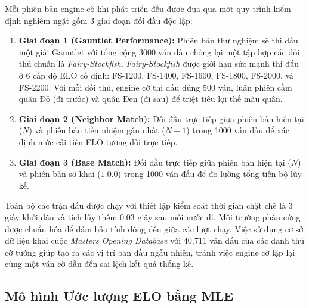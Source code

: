 Mỗi phiên bản engine cờ khi phát triển đều được đưa qua một quy trình kiểm định nghiêm ngặt gồm 3 giai đoạn đối đầu độc lập:

\begin{enumerate}
    \item \textbf{Giai đoạn 1 (Gauntlet Performance):} Phiên bản thử nghiệm sẽ thi đấu một giải Gauntlet với tổng cộng 3000 ván đấu chống lại một tập hợp các đối thủ chuẩn là \textit{Fairy-Stockfish}. \textit{Fairy-Stockfish} được giới hạn sức mạnh thi đấu ở 6 cấp độ ELO cố định: FS-1200, FS-1400, FS-1600, FS-1800, FS-2000, và FS-2200. Với mỗi đối thủ, engine cờ thi đấu đúng 500 ván, luân phiên cầm quân Đỏ (đi trước) và quân Đen (đi sau) để triệt tiêu lợi thế màu quân.
    \item \textbf{Giai đoạn 2 (Neighbor Match):} Đối đầu trực tiếp giữa phiên bản hiện tại ($N$) và phiên bản tiền nhiệm gần nhất ($N-1$) trong 1000 ván đấu để xác định mức cải tiến ELO tương đối trực tiếp.
    \item \textbf{Giai đoạn 3 (Base Match):} Đối đầu trực tiếp giữa phiên bản hiện tại ($N$) và phiên bản sơ khai ($1.0.0$) trong 1000 ván đấu để đo lường tổng tiến bộ lũy kế.
\end{enumerate}

Toàn bộ các trận đấu được chạy với thiết lập kiểm soát thời gian chặt chẽ là 3 giây khởi đầu và tích lũy thêm 0.03 giây sau mỗi nước đi. Môi trường phần cứng được chuẩn hóa để đảm bảo tính đồng đều giữa các lượt chạy. Việc sử dụng cơ sở dữ liệu khai cuộc \textit{Masters Opening Database} với 40,711 ván đấu của các danh thủ cờ tướng giúp tạo ra các vị trí ban đầu ngẫu nhiên, tránh việc engine cờ lặp lại cùng một ván cờ dẫn đến sai lệch kết quả thống kê.



\subsection{Mô hình Ước lượng ELO bằng MLE}

